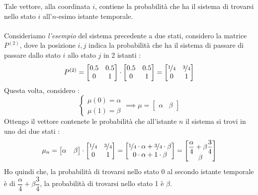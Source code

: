 \documentclass[12pt, letterpaper]{article}
\newcommand{\acc}{\\\hphantom{}\\}
\begin{document}
Tale vettore, alla coordinata \(i\), contiene la probabilità che ha il sistema di trovarsi nello stato \(i\) 
all'\(n\)-esimo istante temporale.\acc 
Consideriamo \textit{l'esempio} del sistema precedente a due stati, considero la matrice \(P^{(2)}\), dove 
la posizione \(i,j\) indica la probabilità che ha il sistema di passare di passare dallo stato 
\(i\) allo stato \(j\) in 2 istanti : $$
P^{(2)}=\begin{bmatrix}
    0.5&0.5\\
    0&1
    \end{bmatrix}\cdot \begin{bmatrix}
        0.5&0.5\\
        0&1
        \end{bmatrix}=\begin{bmatrix}
            \nicefrac{1}{4}&\nicefrac{3}{4}\\
            0&1
            \end{bmatrix}
$$
Questa volta, considero : 
$$\begin{cases}
    \mu(0)=\alpha \\
    \mu(1)=\beta
\end{cases}\implies \mu=\begin{bmatrix}
    \alpha&\beta
\end{bmatrix}$$
Ottengo il vettore contenete le probabilità che all'istante \(n\) il sistema si trovi in uno dei due stati : 
$$
\mu_n=\begin{bmatrix}
\alpha&\beta
\end{bmatrix} \cdot \begin{bmatrix}
    \nicefrac{1}{4}&\nicefrac{3}{4}\\
    0&1
    \end{bmatrix}=\begin{bmatrix}
        \nicefrac{1}{4}\cdot\alpha +\nicefrac{3}{4}\cdot\beta \\
        0\cdot \alpha + 1\cdot \beta 
        \end{bmatrix}=\begin{bmatrix}
            \dfrac{\alpha}{4}+\beta\dfrac{3}{4}\\ \beta
            \end{bmatrix}
$$
Ho quindi che, la probabilità di trovarsi nello stato 0 al secondo istante temporale 
è di \(\dfrac{\alpha}{4}+\beta\dfrac{3}{4}\), la probabilità di trovarsi nello stato 
1 è \(\beta\).
\end{document}
